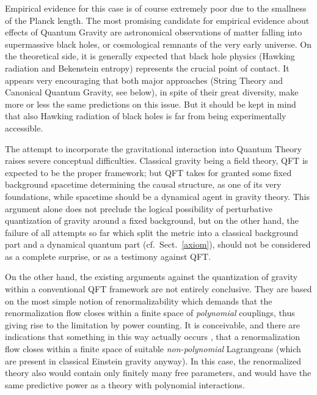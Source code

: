 \documentclass[multphys,vecphys]{svmult}
\begin{document}
Empirical evidence for this case is of course extremely poor due to the
smallness of the Planck length. The most
promising candidate for empirical evidence about effects of Quantum
Gravity are astronomical observations of matter falling into
supermassive black holes, or cosmological remnants
of the very early universe. On the theoretical side, it is generally
expected that black hole physics (Hawking
radiation and Bekenstein entropy) represents the crucial point of
contact. It appears very encouraging that both major approaches
(String Theory and Canonical Quantum Gravity, see below), in spite of
their great diversity, make more or less the same predictions on this
issue. But it should be kept in mind that also Hawking radiation of
black holes is far from being experimentally accessible.  

The attempt to incorporate the gravitational
interaction into Quantum Theory raises severe conceptual
difficulties. Classical gravity being a field theory, QFT is expected
to be the proper framework; but QFT takes for granted some fixed
background spacetime determining the
causal structure, as one of its very foundations,
while spacetime should be a dynamical agent in gravity theory. This
argument alone does not preclude the logical possibility of
perturbative
quantization of gravity around a fixed background,
but on the other hand, the failure of all attempts so far which split
the metric into a classical background part and a dynamical quantum
part (cf.\ Sect.~\ref{axiom}), should not be considered as a complete
surprise, or as a testimony against QFT.  

On the other hand, the existing arguments against the
quantization of gravity within a conventional QFT
framework are not entirely conclusive. They are based on the most
simple notion of renormalizability which
demands that the renormalization flow closes within a finite space of
{\em polynomial} couplings, thus giving rise to the limitation by
power counting. It is conceivable, and there are
indications that something in this way actually occurs \cite{Reu},
that a renormalization flow closes within a finite space of suitable 
{\em non-polynomial} Lagrangeans (which are present in classical
Einstein gravity anyway). In this case, the renormalized theory also
would contain only finitely many free parameters, and would have the
same predictive power as a theory with polynomial interactions.
\end{document}
